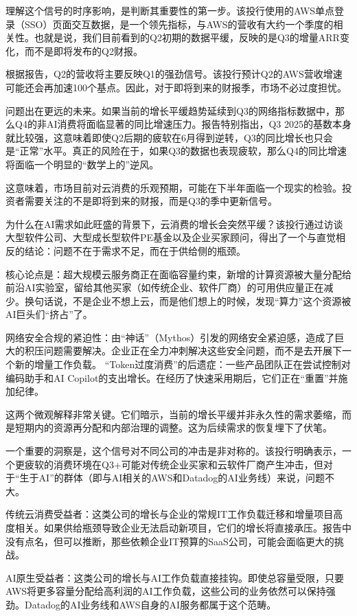 \documentclass[11pt]{ctexart}
\begin{document}
理解这个信号的时序影响，是判断其重要性的第一步。该投行使用的AWS单点登录（SSO）页面交互数据，是一个领先指标，与AWS的营收有大约一个季度的相关性。也就是说，我们目前看到的Q2初期的数据平缓，反映的是Q3的增量ARR变化，而不是即将发布的Q2财报。

根据报告，Q2的营收将主要反映Q1的强劲信号。该投行预计Q2的AWS营收增速可能还会再加速100个基点。因此，对于即将到来的财报季，市场不必过度担忧。

问题出在更远的未来。如果当前的增长平缓趋势延续到Q3的网络指标数据中，那么Q4的非AI消费将面临显著的同比增速压力。报告特别指出，Q3 2025的基数本身就比较强，这意味着即使Q2后期的疲软在6月得到逆转，Q3的同比增长也只会是“正常”水平。真正的风险在于，如果Q3的数据也表现疲软，那么Q4的同比增速将面临一个明显的“数学上的”逆风。

这意味着，市场目前对云消费的乐观预期，可能在下半年面临一个现实的检验。投资者需要关注的不是即将到来的财报，而是Q3的季中更新信号。

为什么在AI需求如此旺盛的背景下，云消费的增长会突然平缓？该投行通过访谈大型软件公司、大型成长型软件PE基金以及企业买家顾问，得出了一个与直觉相反的结论：问题不在于需求不足，而在于供给侧的瓶颈。

核心论点是：超大规模云服务商正在面临容量约束，新增的计算资源被大量分配给前沿AI实验室，留给其他买家（如传统企业、软件厂商）的可用供应量正在减少。换句话说，不是企业不想上云，而是他们想上的时候，发现“算力”这个资源被AI巨头们“挤占”了。

网络安全合规的紧迫性：由“神话”（Mythos）引发的网络安全紧迫感，造成了巨大的积压问题需要解决。企业正在全力冲刺解决这些安全问题，而不是去开展下一个新的增量工作负载。 “Token过度消费”的后遗症：一些产品团队正在尝试控制对编码助手和AI Copilot的支出增长。在经历了快速采用期后，它们正在“重置”并施加纪律。

这两个微观解释非常关键。它们暗示，当前的增长平缓并非永久性的需求萎缩，而是短期内的资源再分配和内部治理的调整。这为后续需求的恢复埋下了伏笔。

一个重要的洞察是，这个信号对不同公司的冲击是非对称的。该投行明确表示，一个更疲软的消费环境在Q3+可能对传统企业买家和云软件厂商产生冲击，但对于“生于AI”的群体（即与AI相关的AWS和Datadog的AI业务线）来说，问题不大。

传统云消费受益者：这类公司的增长与企业的常规IT工作负载迁移和增量项目高度相关。如果供给瓶颈导致企业无法启动新项目，它们的增长将直接承压。报告中没有点名，但可以推断，那些依赖企业IT预算的SaaS公司，可能会面临更大的挑战。

AI原生受益者：这类公司的增长与AI工作负载直接挂钩。即使总容量受限，只要AWS将更多容量分配给高利润的AI工作负载，这些公司的业务依然可以保持强劲。Datadog的AI业务线和AWS自身的AI服务都属于这个范畴。
\end{document}
